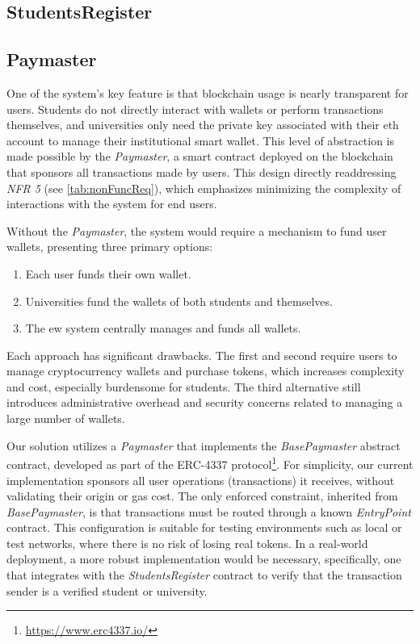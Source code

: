 \subsection{StudentsRegister}

\subsection{Paymaster}
One of the system's key feature is that blockchain usage is nearly transparent for users. Students do not directly interact with wallets or perform transactions themselves, and universities only need the private key associated with their \acrshort{eth} account to manage their institutional smart wallet. This level of abstraction is made possible by the \textit{Paymaster}, a smart contract deployed on the blockchain that sponsors all transactions made by users. This design directly readdressing \textit{NFR 5} (see \cref{tab:nonFuncReq}), which emphasizes minimizing the complexity of interactions with the system for end users.

Without the \textit{Paymaster}, the system would require a mechanism to fund user wallets, presenting three primary options:

\begin{enumerate}
    \item Each user funds their own wallet.
    \item Universities fund the wallets of both students and themselves.
    \item The \acrshort{ew} system centrally manages and funds all wallets.
\end{enumerate}
Each approach has significant drawbacks. The first and second require users to manage cryptocurrency wallets and purchase tokens, which increases complexity and cost, especially burdensome for students. The third alternative still introduces administrative overhead and security concerns related to managing a large number of wallets.

Our solution utilizes a \textit{Paymaster} that implements the \textit{BasePaymaster} abstract contract, developed as part of the ERC-4337 protocol\footnote{\url{https://www.erc4337.io/}}. For simplicity, our current implementation sponsors all user operations (transactions) it receives, without validating their origin or gas cost. The only enforced constraint, inherited from \textit{BasePaymaster}, is that transactions must be routed through a known \textit{EntryPoint} contract.
This configuration is suitable for testing environments such as local or test networks, where there is no risk of losing real tokens. In a real-world deployment, a more robust implementation would be necessary, specifically, one that integrates with the \textit{StudentsRegister} contract to verify that the transaction sender is a verified student or university. 